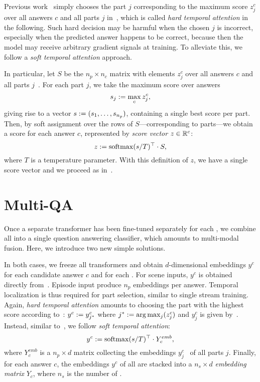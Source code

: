 \documentclass[10pt,twocolumn,letterpaper]{article}
\begin{document}
Previous work~\cite{garcia2020knowledge} simply chooses the part $j$ corresponding to the maximum score $z_j^c$ over all answers $c$ and all parts $j$ in~, which is called \emph{hard temporal attention} in the following. Such hard decision may be harmful when the chosen $j$ is incorrect, especially when the predicted answer happens to be correct, because then the model may receive arbitrary gradient signals at training. To alleviate this, we follow a \emph{soft temporal attention} approach.

In particular, let $S$ be the $n_p \times n_c$ matrix with elements $z_j^c$ over all answers $c$ and all parts $j$~. For each part $j$, we take the maximum score over answers
\begin{equation}
    s_j \mathrel{:=} \max_c z_j^c,
\end{equation}
giving rise to a vector $s \mathrel{:=} (s_1,\dots,s_{n_p})$, containing a single best score per part. Then, by soft assignment over the rows of $S$---corresponding to parts---we obtain a score for each answer $c$, represented by \emph{score vector} $z \in \mathbb{R}^c$:
\begin{equation}
    z \mathrel{:=} \operatorname{softmax}(s / T)^\top \cdot S,
\label{eq:temporal-attn}
\end{equation}
where $T$ is a temperature parameter. With this definition of $z$, we have a single score vector and we proceed as in~.
 \section{Multi-\branch QA}
\label{sec:fusion}

Once a separate transformer has been fine-tuned separately for each \branch, we combine all \branches into a single question answering classifier, which amounts to multi-modal fusion. Here, we introduce two new simple solutions.

In both cases, we freeze all transformers and obtain $d$-dimensional embeddings $y^c$ for each candidate answer $c$ and for each \branch. For scene inputs, $y^c$ is obtained directly from~. Episode input \branches produce $n_p$ embeddings per answer. Temporal localization is thus required for part selection, similar to single stream training. Again, \emph{hard temporal attention} amounts to choosing the part with the highest score according to~: $y^c \mathrel{:=} y_{j^*}^c$ where $j^* \mathrel{:=} \arg\max_j(z_j^c)$ and $y_j^c$ is given by~. Instead, similar to~, we follow \emph{soft temporal attention}:
\begin{equation}
    y^c \mathrel{:=} \operatorname{softmax}(s / T)^\top \cdot Y_c^{emb},
\label{eq:temporal-attn-multi}
\end{equation}
where $Y_c^{emb}$ is a $n_p \times d$ matrix collecting the embeddings $y_j^c$~ of all parts $j$. Finally, for each answer $c$, the embeddings $y^c$ of all \branches are stacked into a $n_s \times d$ \emph{embedding matrix} $Y_c$, where $n_s$ is the number of \branches.
 
\end{document}

